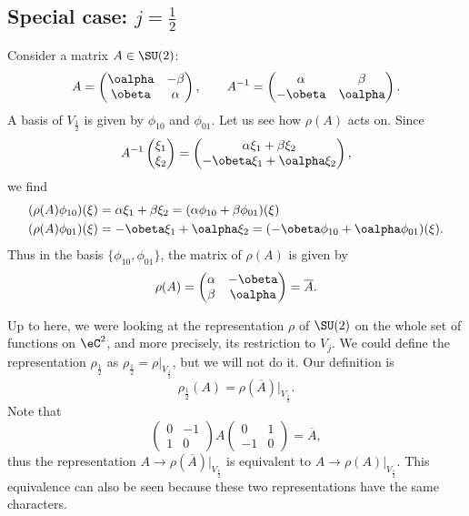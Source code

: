 \subsection{Special case: \texorpdfstring{$j=\frac{1}{2}$}{j=1/2}}

Consider a matrix $A\in\SU(2)$:
\begin{equation}
A=\begin{pmatrix}
\oalpha & -\beta \\
\obeta & \alpha
\end{pmatrix},\qquad
A^{-1}=\begin{pmatrix}
\alpha & \beta \\
-\obeta & \oalpha
\end{pmatrix}.
\end{equation}
A basis of $V_{\frac{1}{2}}$ is given by $\phi_{10}$ and $\phi_{01}$. Let us see how $\rho(A)$ acts on. Since
\[
A^{-1}\begin{pmatrix}
\xi_1 \\
\xi_2
\end{pmatrix}=
\begin{pmatrix}
\alpha\xi_1+\beta\xi_2 \\
-\obeta\xi_1+\oalpha\xi_2
\end{pmatrix},
\]
we find
\begin{equation}
\begin{split}
  (\rho(A)\phi_{10})(\xi)&=\alpha\xi_1+\beta\xi_2=(\alpha\phi_{10}+\beta\phi_{01})(\xi)\\
  (\rho(A)\phi_{01})(\xi)&=-\obeta\xi_1+\oalpha\xi_2=(-\obeta\phi_{10}+\oalpha\phi_{01})(\xi).
\end{split}
\end{equation}
Thus in the basis $\{\phi_{10},\phi_{01}\}$, the matrix of $\rho(A)$ is given by
\begin{equation}
\rho(A)=\begin{pmatrix}
\alpha & -\obeta \\
\beta & \oalpha
\end{pmatrix}=\overline{A}.
\end{equation}

Up to here, we were looking at the representation $\rho$ of $\SU(2)$ on the whole set of functions on $\eC^2$, and more precisely, its restriction to $V_j$. We could define the representation $\rho_{\frac{1}{2}}$ as $\rho_{\frac{1}{2}}=\rho|_{V_{\frac{1}{2}}}$, but we will not do it. Our definition is
\begin{equation}
  \rho_{\frac{1}{2}}(A)=\rho(\overline{A})|_{V_{\frac{1}{2}}}.
\end{equation}
Note that
\[
\begin{pmatrix}
0 & -1 \\
1 & 0
\end{pmatrix}
A
\begin{pmatrix}
0 & 1 \\
-1 & 0
\end{pmatrix}=\overline{A},
\]
thus the representation $A\to\rho(\overline{A})|_{V_{\frac{1}{2}}}$ is equivalent to $A\to\rho(A)|_{V_{\frac{1}{2}}}$. This equivalence can also be seen because these two representations have the same characters\quextproj.

